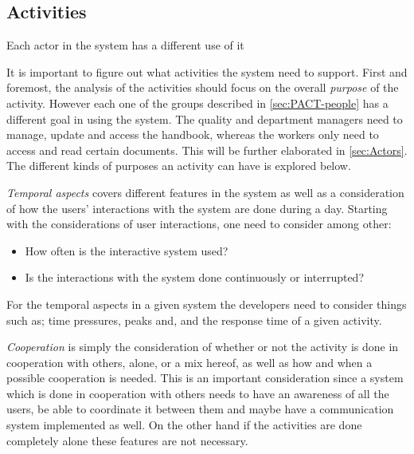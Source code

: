 \subsection{Activities}\label{sec:PACT-actvities}
Each actor in the system has a different use of it

It is important to figure out what activities the system need to support.
First and foremost, the analysis of the activities should focus on the overall \textit{purpose} of the activity.
However each one of the groups described in \cref{sec:PACT-people} has a different goal in using the system.
The quality and department managers need to manage, update and access the handbook, whereas the workers only need to access and read certain documents.
This will be further elaborated in \cref{sec:Actors}.
The different kinds of purposes an activity can have is explored below.


\textit{Temporal aspects} covers different features in the system as well as a consideration of how the users' interactions with the system are done during a day.
Starting with the considerations of user interactions, one need to consider among other:

\begin{itemize}
	\item How often is the interactive system used?
	\item Is the interactions with the system done continuously or interrupted?
\end{itemize}

For the temporal aspects in a given system the developers need to consider things such as; time pressures, peaks and, and the response time of a given activity.

\textit{Cooperation} is simply the consideration of whether or not the activity is done in cooperation with others, alone, or a mix hereof, as well as how and when a possible cooperation is needed.
This is an important consideration since a system which is done in cooperation with others needs to have an awareness of all the users, be able to coordinate it between them and maybe have a communication system implemented as well.
On the other hand if the activities are done completely alone these features are not necessary.

